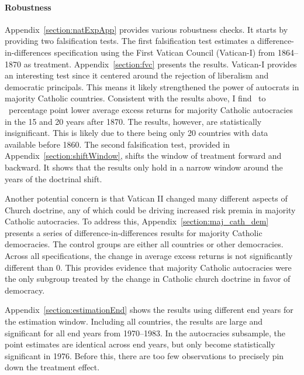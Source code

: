 

\paragraph{Robustness} 

Appendix~\ref{section:natExpApp} provides various robustness checks. It starts by providing two falsification tests. The first falsification test estimates a difference-in-differences specification using the First Vatican Council (Vatican-I) from 1864--1870 as treatment. Appendix~\ref{section:fvc} presents the results. Vatican-I provides an interesting test since it centered around the rejection of liberalism and democratic principals. This means it likely strengthened the power of autocrats in majority Catholic countries. Consistent with the results above, I find \tabCEightLow\ to \tabCEightHigh\ percentage point lower average excess returns for majority Catholic autocracies in the 15 and 20 years after 1870. The results, however,  are statistically insignificant. This is likely due to there being only 20 countries with data available before 1860. The second falsification test, provided in Appendix~\ref{section:shiftWindow}, shifts the window of treatment forward and backward. It shows that the results only hold in a narrow window around the years of the doctrinal shift.

Another potential concern is that Vatican II changed many different aspects of Church doctrine, any of which could be driving increased risk premia in majority Catholic autocracies. To address this, Appendix~\ref{section:maj_cath_dem} presents a series of difference-in-differences results for majority Catholic democracies. The control groups are either all countries or other democracies. Across all specifications, the change in average excess returns is not significantly different than 0. This provides evidence that majority Catholic autocracies were the only subgroup treated by the change in Catholic church doctrine in favor of democracy.

Appendix~\ref{section:estimationEnd} shows the results using different end years for the estimation window.  Including all countries, the results are large and significant for all end years from 1970--1983. In the autocracies subsample, the point estimates are identical across end years, but only become statistically significant in 1976. Before this, there are too few observations to precisely pin down the treatment effect.

